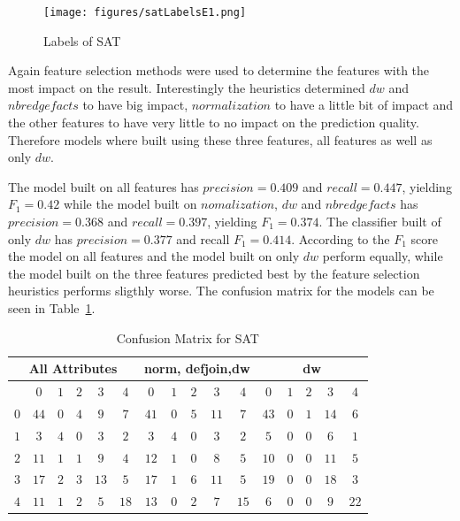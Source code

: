\begin{figure}[h]
	\center
	\texttt{[image: figures/satLabelsE1.png]}
	\caption{Labels of SAT\label{fig:satLabelsE1}}
\end{figure}

\par Again feature selection methods were used to determine the features with the most impact on the result. Interestingly the heuristics determined $dw$ and $nbredgefacts$ to have big impact, $normalization$ to have a little bit of impact and the other features to have very little to no impact on the prediction quality. Therefore models where built using these three features, all features as well as only $dw$.

The model built on all features has $precision=0.409$ and $recall=0.447$, yielding $F_1=0.42$ while the model built on $nomalization$, $dw$ and $nbredgefacts$ has $precision=0.368$ and $recall=0.397$, yielding $F_1 =0.374$. The classifier built of only $dw$ has $precision=0.377$ and recall $F_1=0.414$. According to the $F_1$ score the model on all features and the model built on only $dw$ perform equally, while the model built on the three features predicted best by the feature selection heuristics performs sligthly worse. The confusion matrix for the models can be seen in Table~\ref{tbl:satCME1}.

\begin{table}[h]
	\center
	\begin{tabular}{|c|ccccc|ccccc|ccccc|}
		\hline\multicolumn{6}{|c|}{All Attributes} &\multicolumn{5}{|c|}{norm, defjoin,dw}&\multicolumn{5}{|c|}{dw}\\
		\hline &$0$&$1$&$2$&$3$&$4$&$0$&$1$&$2$&$3$&$4$&$0$&$1$&$2$&$3$&$4$\\
		\hline $0$&$44$&$0$&$4$&$9$&$7$&$41$&$0$&$5$&$11$&$7$&$43$&$0$&$1$&$14$&$6$\\
					 $1$&$3$ &$4$&$0$&$3$&$2$&$3$&$4$&$0$&$3$&$2$&$5$&$0$&$0$&$6$&$1$\\
           $2$&$11$&$1$&$1$&$9$&$4$&$12$&$1$&$0$&$8$&$5$&$10$&$0$&$0$&$11$&$5$\\
				   $3$&$17$&$2$&$3$&$13$&$5$&$17$&$1$&$6$&$11$&$5$&$19$&$0$&$0$&$18$&$3$\\
				   $4$&$11$&$1$&$2$&$5$&$18$&$13$&$0$&$2$&$7$&$15$&$6$&$0$&$0$&$9$&$22$\\
		\hline
	\end{tabular}
	\caption{Confusion Matrix for SAT}
	\label{tbl:satCME1}
\end{table}
